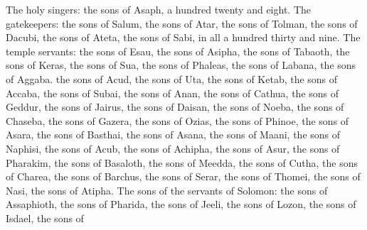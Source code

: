 {The holy singers: the sons of Asaph, a hundred
 twenty and eight.
The gatekeepers: the sons of
 Salum, the sons of
 Atar, the sons of Tolman, the sons of
 Dacubi, the sons of
 Ateta, the sons of
 Sabi, in all a hundred thirty and nine.
The temple servants: the sons of
 Esau, the sons of
 Asipha, the sons of Tabaoth, the sons of
 Keras, the sons of
 Sua, the sons of
 Phaleas, the sons of Labana, the sons of
 Aggaba.
the sons of
 Acud, the sons of Uta, the sons of Ketab, the sons of
 Accaba, the sons of
 Subai, the sons of
 Anan, the sons of
 Cathua, the sons of
 Geddur,
the sons of
 Jairus, the sons of
 Daisan, the sons of
 Noeba, the sons of Chaseba, the sons of
 Gazera, the sons of
 Ozias, the sons of
 Phinoe, the sons of Asara, the sons of
 Basthai, the sons of
 Asana, the sons of
 Maani, the sons of
 Naphisi, the sons of
 Acub, the sons of
 Achipha, the sons of
 Asur, the sons of Pharakim, the sons of
 Basaloth,
the sons of
 Meedda, the sons of Cutha, the sons of
 Charea, the sons of
 Barchus, the sons of
 Serar, the sons of
 Thomei, the sons of
 Nasi, the sons of Atipha.
The sons of the servants of Solomon: the sons of
 Assaphioth, the sons of
 Pharida, the sons of
 Jeeli, the sons of
 Lozon, the sons of
 Isdael, the sons of
}
